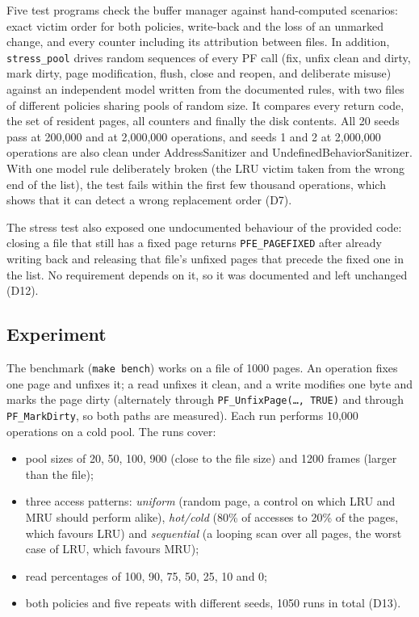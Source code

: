 \documentclass[11pt,a4paper]{article}
\begin{document}
Five test programs check the buffer manager against hand-computed scenarios: exact victim order for both policies, write-back and the loss of an unmarked change, and every counter including its attribution between files. In addition, \texttt{stress\_pool} drives random sequences of every PF call (fix, unfix clean and dirty, mark dirty, page modification, flush, close and reopen, and deliberate misuse) against an independent model written from the documented rules, with two files of different policies sharing pools of random size. It compares every return code, the set of resident pages, all counters and finally the disk contents. All 20 seeds pass at 200{,}000 and at 2{,}000{,}000 operations, and seeds 1 and 2 at 2{,}000{,}000 operations are also clean under AddressSanitizer and UndefinedBehaviorSanitizer. With one model rule deliberately broken (the LRU victim taken from the wrong end of the list), the test fails within the first few thousand operations, which shows that it can detect a wrong replacement order (D7).

The stress test also exposed one undocumented behaviour of the provided code: closing a file that still has a fixed page returns \texttt{PFE\_PAGEFIXED} after already writing back and releasing that file's unfixed pages that precede the fixed one in the list. No requirement depends on it, so it was documented and left unchanged (D12).

\subsection{Experiment}

The benchmark (\texttt{make bench}) works on a file of 1000 pages. An operation fixes one page and unfixes it; a read unfixes it clean, and a write modifies one byte and marks the page dirty (alternately through \texttt{PF\_UnfixPage(\ldots, TRUE)} and through \texttt{PF\_MarkDirty}, so both paths are measured). Each run performs 10{,}000 operations on a cold pool. The runs cover:

\begin{itemize}
\item pool sizes of 20, 50, 100, 900 (close to the file size) and 1200 frames (larger than the file);
\item three access patterns: \emph{uniform} (random page, a control on which LRU and MRU should perform alike), \emph{hot/cold} (80\% of accesses to 20\% of the pages, which favours LRU) and \emph{sequential} (a looping scan over all pages, the worst case of LRU, which favours MRU);
\item read percentages of 100, 90, 75, 50, 25, 10 and 0;
\item both policies and five repeats with different seeds, 1050 runs in total (D13).
\end{itemize}
\end{document}
